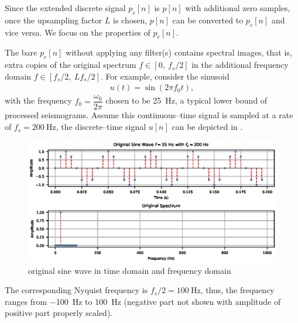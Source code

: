 Since the extended discrete signal $p_e[n]$ is $p[n]$ with additional zero samples, once the upsampling factor $L$ is chosen, $p[n]$ can be converted to $p_e[n]$ and vice versa. We focus on the properties of $p_e[n]$.

The bare $p_e[n]$ without applying any filter(s) contains spectral images, that is, extra copies of the original spectrum $f\in[0,~f_s/2]$ in the additional frequency domain $f\in[f_s/2,~Lf_s/2]$. For example, consider the sinusoid
\begin{gather}
u(t)=\sin\left(2\pi{}f_0t\right),
\end{gather}
with the frequency $f_0=\dfrac{\omega_0}{2\pi}$ chosen to be \SI{25}{\hertz}, a typical lower bound of processed seismograms. Assume this continuous--time signal is sampled at a rate of $f_s=\SI{200}{\hertz}$, the discrete--time signal $u[n]$ can be depicted in .
\begin{figure}[htb!]
\centering
\includegraphics{PIC/PureSineOrigin}
\caption{original sine wave in time domain and frequency domain}\label{fig:original}
\end{figure}
The corresponding Nyquist frequency is $f_s/2=\SI{100}{\hertz}$, thus, the frequency ranges from \SI{-100}{\hertz} to \SI{100}{\hertz} (negative part not shown with amplitude of positive part properly scaled).

